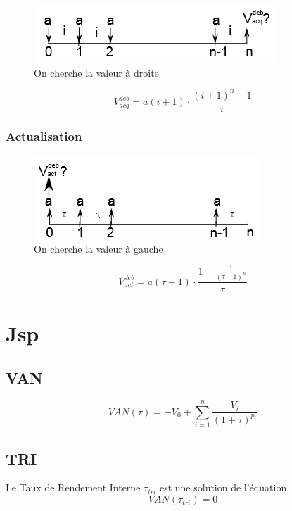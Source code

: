 \documentclass{article}
\begin{document}
\begin{figure}[H]
    \centering
    \includegraphics{versement-constant.png}
    \\On cherche la valeur à droite
\end{figure}

$$\boxed{V^{deb}_{acq} = a(i+1)\cdot\dfrac{(i+1)^n-1}{i}}$$

\subsubsection{Actualisation}

\begin{figure}[H]
    \centering
    \includegraphics{versement-constant-actu.png}
    \\On cherche la valeur à gauche
\end{figure}

$$\boxed{V^{deb}_{act} = a(\tau+1)\cdot\dfrac{1-\frac{1}{(\tau+1)^n}}{\tau}}$$

\section {Jsp}
\subsection{VAN}
$$\boxed{VAN(\tau) = -V_0 + \sum_{i=1}^n \dfrac{V_i}{(1+\tau)^{p_i}}}$$
\subsection{TRI}
Le Taux de Rendement Interne $\tau_{tri}$ est une solution de l'équation 
$$VAN(\tau_{tri}) = 0$$
\end{document}
